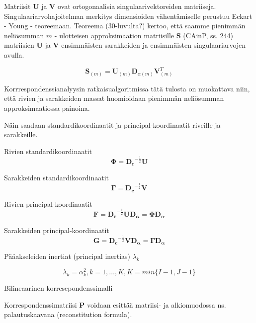 \documentclass[finnish,]{article}
\begin{document}
Matriisit \(\boldsymbol{U}\) ja \(\boldsymbol{V}\) ovat ortogonaalisia
singulaarivektoreiden matriiseja. Singulaariarvohajoitelman merkitys
dimensioiden vähentämiselle perustuu Eckart - Young - teoreemaan.
Teoreema (30-luvulta?) kertoo, että saamme pienimmän neliösumman \(m\) -
ulotteisen approksimaation matriisille \(\boldsymbol{S}\) (CAinP, ss.
244) matriisien \(\boldsymbol{U}\) ja \(\boldsymbol{V}\) ensimmäisten
sarakkeiden ja ensimmäisten singulaariarvojen avulla.

\[
\boldsymbol{S}_{(m)} = \boldsymbol{U}_{(m)} \boldsymbol{D}_{\alpha(m)} \boldsymbol{V}_{(m)}^{T}
\]

Korrrespondenssianalyysin ratkaisualgoritmissa tätä tulosta on
muokattava niin, että rivien ja sarakkeiden massat huomioidaan pienimmän
neliösumman approksimaatiossa painoina.

Näin saadaan standardikoordinaatit ja principal-koordinaatit riveille ja
sarakkeille.

Rivien standardikoordinaatit \begin{equation}
\boldsymbol{\Phi} = \boldsymbol{D_r}^{-\frac{1}{2}} \boldsymbol{U} \label{B} 
\end{equation}

Sarakkeiden standardikoordinaatit \begin{equation}
 \boldsymbol{\Gamma} = \boldsymbol{D_c}^{-\frac{1}{2}} \boldsymbol{V} \label{C}
\end{equation}

Rivien principal-koordinaatit \begin{equation}
 \boldsymbol{F} =   \boldsymbol{D_r}^{-\frac{1}{2}} \boldsymbol{U}  \boldsymbol{D_{\alpha}} = \boldsymbol{\Phi} \boldsymbol{D_{\alpha}} \label{D}
\end{equation}

Sarakkeiden principal-koordinaatit \begin{equation}
 \boldsymbol{G}  = \boldsymbol{D_c}^{-\frac{1}{2}} \boldsymbol{V} \boldsymbol{D_{\alpha}} = \boldsymbol{\Gamma}  \boldsymbol{D_{\alpha}} \label{E}
\end{equation}

Pääakseleiden inertiat (principal inertias) \(\lambda_{k}\)

\begin{equation}
\lambda_{k} = \alpha_{k}^2, k = 1,\dots,K,
K = min \{ I-1, J-1 \}
\end{equation}

Bilineaarinen korresepondenssimalli

Korrespondenssimatriisi \(\boldsymbol{P}\) voidaan esittää matriisi- ja
alkiomuodossa ns. palautuskaavana (reconstitution formula).
\end{document}
